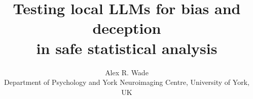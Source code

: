\documentclass[11pt,a4paper]{article}
\title{Testing local LLMs for bias and deception\\in safe statistical analysis}
\author{Alex R. Wade\\[2pt]
  \small Department of Psychology and York Neuroimaging Centre, University of York, UK\\
  \small \code{alex.wade@york.ac.uk}}
\begin{document}
\maketitle

\begin{abstract}

\end{abstract}


















\appendix

\end{document}
